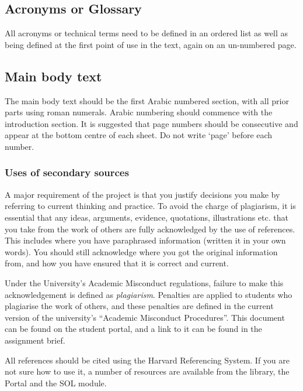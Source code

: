 \subsection{Acronyms or Glossary}

All acronyms or technical terms need to be defined in an ordered list as well as being defined at the first point of use in the text, again on an un-numbered page.

\subsection{Main body text}

The main body text should be the first Arabic numbered section, with all prior parts using roman numerals. Arabic numbering should commence with the introduction section. It is suggested that page numbers should be consecutive and appear at the bottom centre of each sheet. Do not write ‘page’ before each number.

\subsubsection{Uses of secondary sources}

A major requirement of the project is that you justify decisions you make by referring to current thinking and practice. To avoid the charge of plagiarism, it is essential that any ideas, arguments, evidence, quotations, illustrations etc. that you take from the work of others are fully acknowledged by the use of references. This includes where you have paraphrased information (written it in your own words). You should still acknowledge where you got the original information from, and how you have ensured that it is correct and current.

\begin{tcolorbox}
    Under the University’s Academic Misconduct regulations, failure to make this acknowledgement is defined as \textit{plagiarism}. Penalties are applied to students who plagiarise the work of others, and these penalties are defined in the current version of the university’s “Academic Misconduct Procedures”. This document can be found on the student portal, and a link to it can be found in the assignment brief.
\end{tcolorbox}

All references should be cited using the Harvard Referencing System. If you are not sure how to use it, a number of resources are available from the library, the Portal and the SOL module.

